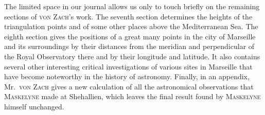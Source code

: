 The limited space in our journal allows us only to touch briefly on the remaining sections of \textsc{von Zach}’s work. The seventh section determines the heights of the triangulation points and of some other places above the Mediterranean Sea. The eighth section gives the positions of a great many points in the city of Marseille and its surroundings by their distances from the meridian and perpendicular of the Royal Observatory there and by their longitude and latitude. It also contains several other interesting critical investigations of various sites in Marseille that have become noteworthy in the history of astronomy. Finally, in an appendix, Mr.\ \textsc{von Zach} gives a new calculation of all the astronomical observations that \textsc{Maskelyne} made at Shehallien, which leaves the final result found by \textsc{Maskelyne} himself unchanged.
